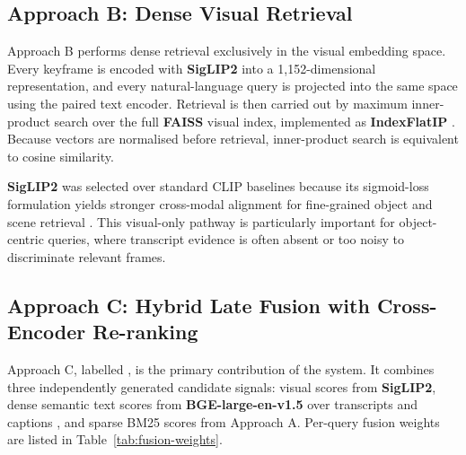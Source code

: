 \subsection{Approach B: Dense Visual Retrieval}
\label{sec:approach-b}

Approach B performs dense retrieval exclusively in the visual embedding space. Every keyframe is encoded with \textbf{SigLIP2} into a 1,152-dimensional representation, and every natural-language query is projected into the same space using the paired text encoder. Retrieval is then carried out by maximum inner-product search over the full \textbf{FAISS} visual index, implemented as \textbf{IndexFlatIP} \cite{johnson2021billion}. Because vectors are normalised before retrieval, inner-product search is equivalent to cosine similarity.

\textbf{SigLIP2} was selected over standard CLIP baselines because its sigmoid-loss formulation yields stronger cross-modal alignment for fine-grained object and scene retrieval \cite{zhai2023sigmoid}. This visual-only pathway is particularly important for object-centric queries, where transcript evidence is often absent or too noisy to discriminate relevant frames.

\subsection{Approach C: Hybrid Late Fusion with Cross-Encoder Re-ranking}
\label{sec:approach-c}

Approach C, labelled \fusionname, is the primary contribution of the system. It combines three independently generated candidate signals: visual scores from \textbf{SigLIP2}, dense semantic text scores from \textbf{BGE-large-en-v1.5} over transcripts and captions \cite{chen2024bge}, and sparse BM25 scores from Approach A. Per-query fusion weights are listed in Table~\ref{tab:fusion-weights}.

